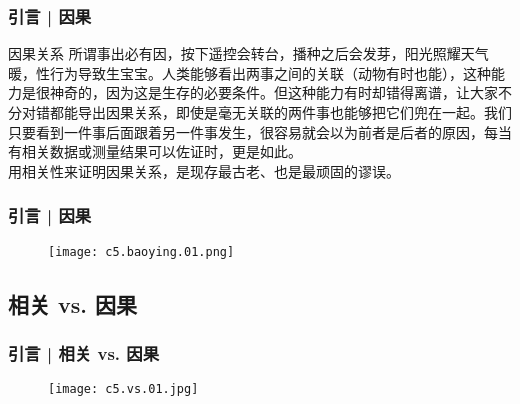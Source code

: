 \begin{frame}
  \frametitle{引言 | 因果}
  \begin{block}{因果关系}
    所谓事出必有因，按下遥控会转台，播种之后会发芽，阳光照耀天气暖，性行为导致生宝宝。人类能够看出两事之间的关联（动物有时也能），这种能力是很神奇的，因为这是生存的必要条件。但这种能力有时却错得离谱，让大家不分对错都能导出因果关系，即使是毫无关联的两件事也能够把它们兜在一起。我们只要看到一件事后面跟着另一件事发生，很容易就会以为前者是后者的原因，每当有相关数据或测量结果可以佐证时，更是如此。\\
    \vspace{0.5em}
    用相关性来证明因果关系，是现存最古老、也是最顽固的谬误。
  \end{block}
\end{frame}

\begin{frame}
  \frametitle{引言 | 因果}
  \begin{figure}
    \centering
    \texttt{[image: c5.baoying.01.png]}
  \end{figure}
\end{frame}

\subsection{相关 vs. 因果}
\begin{frame}
  \frametitle{引言 | 相关 vs. 因果}
  \begin{figure}
    \centering
    \texttt{[image: c5.vs.01.jpg]}
  \end{figure}
\end{frame}

